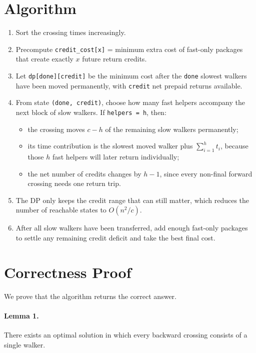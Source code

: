 \documentclass[11pt]{article}
\begin{document}
\section*{Algorithm}

\begin{enumerate}[leftmargin=*]
    \item Sort the crossing times increasingly.
    \item Precompute \texttt{credit\_cost[x]} = minimum extra cost of fast-only packages that create exactly
    $x$ future return credits.
    \item Let \texttt{dp[done][credit]} be the minimum cost after the \texttt{done} slowest walkers have been
    moved permanently, with \texttt{credit} net prepaid returns available.
    \item From state \texttt{(done, credit)}, choose how many fast helpers accompany the next block of slow
    walkers. If \texttt{helpers = h}, then:
    \begin{itemize}[leftmargin=*]
        \item the crossing moves $c-h$ of the remaining slow walkers permanently;
        \item its time contribution is the slowest moved walker plus $\sum_{i=1}^{h} t_i$, because those
        $h$ fast helpers will later return individually;
        \item the net number of credits changes by $h-1$, since every non-final forward crossing needs one
        return trip.
    \end{itemize}
    \item The DP only keeps the credit range that can still matter, which reduces the number of reachable
    states to $O(n^2/c)$.
    \item After all slow walkers have been transferred, add enough fast-only packages to settle any remaining
    credit deficit and take the best final cost.
\end{enumerate}

\section*{Correctness Proof}

We prove that the algorithm returns the correct answer.

\paragraph{Lemma 1.}
There exists an optimal solution in which every backward crossing consists of a single walker.
\end{document}
